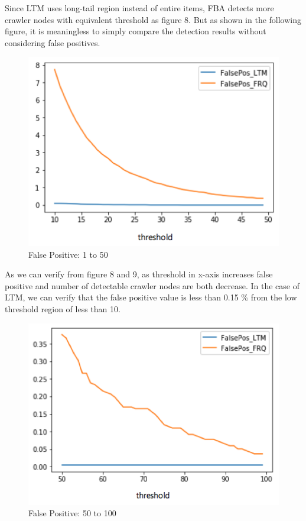 \documentclass[sigconf,anonymous=true]{acmart}
\begin{document}
Since LTM uses long-tail region instead of entire items, FBA detects more crawler nodes with equivalent threshold as figure 8. But as shown in the following figure, it is meaningless to simply compare the detection results without considering false positives.

\begin{figure}[H]
    \centering
    \includegraphics[width=0.85\columnwidth]{figs/figure_fp_compare_01.png}
    \caption{False Positive: 1 to 50}
    \label{fig:my_label}
\end{figure}

As we can verify from figure 8 and 9, as threshold in x-axis increases false positive and number of detectable crawler nodes are both decrease. In the case of LTM, we can verify that the false positive value is less than 0.15 \% from the low threshold region of less than 10.

\begin{figure}[H]
    \centering
    \includegraphics[width=0.85\columnwidth]{figs/figure_fp_compare_02.png}
    \caption{False Positive: 50 to 100}
    \label{fig:my_label}
\end{figure}
\end{document}
